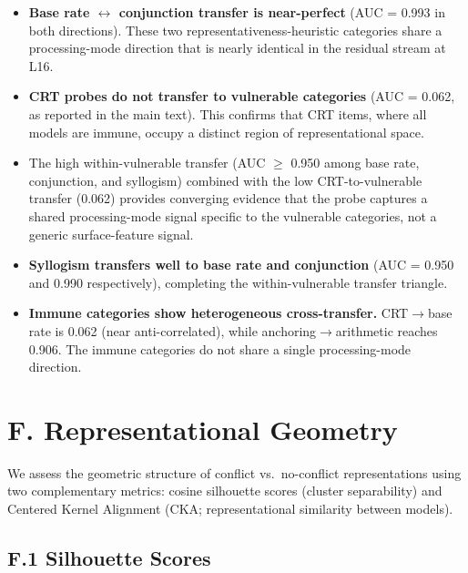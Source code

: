\documentclass{article}
\begin{document}
\begin{itemize}[leftmargin=*,itemsep=4pt]
  \item \textbf{Base rate $\leftrightarrow$ conjunction transfer is
  near-perfect} (AUC = 0.993 in both directions).  These two
  representativeness-heuristic categories share a processing-mode
  direction that is nearly identical in the residual stream at L16.

  \item \textbf{CRT probes do not transfer to vulnerable categories}
  (AUC = 0.062, as reported in the main text).  This confirms that
  CRT items, where all models are immune, occupy a distinct region of
  representational space.

  \item The high within-vulnerable transfer (AUC $\geq$ 0.950 among
  base rate, conjunction, and syllogism) combined with the low
  CRT-to-vulnerable transfer (0.062) provides converging evidence
  that the probe captures a shared processing-mode signal specific to
  the vulnerable categories, not a generic surface-feature signal.

  \item \textbf{Syllogism transfers well to base rate and conjunction}
  (AUC = 0.950 and 0.990 respectively), completing the
  within-vulnerable transfer triangle.

  \item \textbf{Immune categories show heterogeneous cross-transfer.}
  CRT$\to$base rate is 0.062 (near anti-correlated), while
  anchoring$\to$arithmetic reaches 0.906.  The immune categories do
  not share a single processing-mode direction.
\end{itemize}


\section*{F. Representational Geometry}
\label{sec:appendix_geometry}

We assess the geometric structure of conflict vs.\ no-conflict
representations using two complementary metrics: cosine silhouette
scores (cluster separability) and Centered Kernel Alignment (CKA;
representational similarity between models).

\subsection*{F.1 Silhouette Scores}
\end{document}
